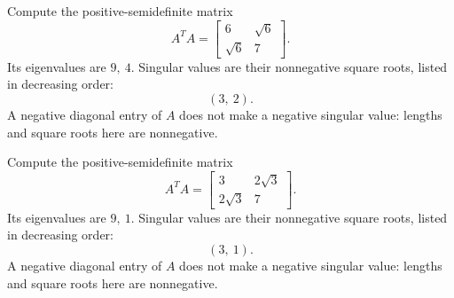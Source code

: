 Compute the positive-semidefinite matrix
\[A^TA=\begin{bmatrix}6&\sqrt{6}\\\sqrt{6}&7\end{bmatrix}.\]
Its eigenvalues are $9,\ 4$. Singular values are their nonnegative square roots, listed in decreasing order:
\[(3,\ 2).\]
A negative diagonal entry of $A$ does not make a negative singular value: lengths and square roots here are nonnegative.

Compute the positive-semidefinite matrix
\[A^TA=\begin{bmatrix}3&2 \sqrt{3}\\2 \sqrt{3}&7\end{bmatrix}.\]
Its eigenvalues are $9,\ 1$. Singular values are their nonnegative square roots, listed in decreasing order:
\[(3,\ 1).\]
A negative diagonal entry of $A$ does not make a negative singular value: lengths and square roots here are nonnegative.


